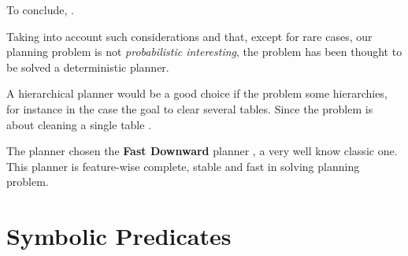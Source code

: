 To conclude,  . 

Taking into account such considerations and that, except for rare cases, our planning problem is not \textit{probabilistic interesting}, the problem has been thought to be solved  a deterministic planner.

A hierarchical planner would be a good choice if the problem  some hierarchies, for instance in the case the goal  to clear several tables. Since the problem is about cleaning a single table .

The planner chosen  the \textbf{Fast Downward} planner \citep{helmert2006fast}, a very well know classic one. 
This planner is feature-wise complete, stable and fast in solving planning problem.

\section{Symbolic Predicates}

